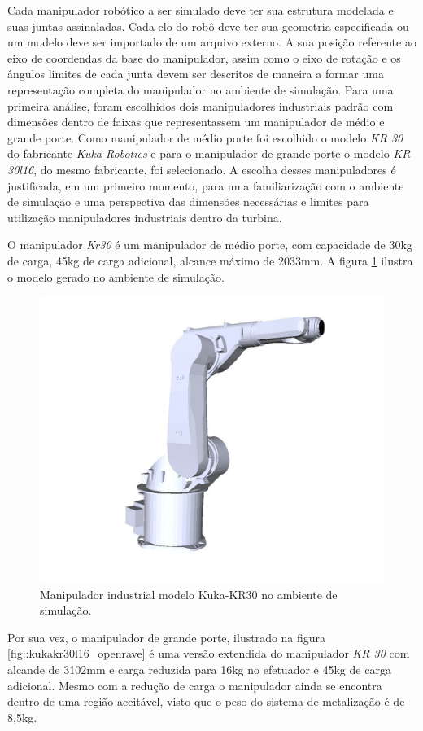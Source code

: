 Cada manipulador robótico a ser simulado deve ter sua estrutura modelada e suas
juntas assinaladas. Cada elo do robô deve ter sua geometria especificada ou um
modelo deve ser importado de um arquivo externo. A sua posição referente ao eixo
de coordendas da base do manipulador, assim como o eixo de rotação e os ângulos
limites de cada junta devem ser descritos de maneira a formar uma representação
completa do manipulador no ambiente de simulação. Para uma primeira análise,
foram escolhidos dois manipuladores industriais padrão com dimensões dentro de
faixas que representassem um manipulador de médio e grande porte. Como
manipulador de médio porte foi escolhido o modelo \textit{KR 30} do fabricante
\textit{Kuka Robotics} e para o manipulador de grande porte o modelo
\textit{KR 30l16}, do mesmo fabricante, foi selecionado.
A escolha desses manipuladores é justificada, em um primeiro momento, para uma
familiarização com o ambiente de simulação e uma perspectiva das dimensões
necessárias e limites para utilização manipuladores industriais dentro da
turbina.

O manipulador \textit{Kr30} é um manipulador de médio porte, com capacidade de
30kg de carga, 45kg de carga adicional, alcance máximo de 2033mm. A figura
\ref{fig::kukakr30_openrave} ilustra o modelo gerado no ambiente de simulação. 

\begin{figure}[h!]
\centering
	\includegraphics[width=0.8\columnwidth]{figs/openrave/kukakr30_openrave}
	\caption{Manipulador industrial modelo Kuka-KR30 no ambiente de simulação.}
	\label{fig::kukakr30_openrave}
\end{figure}

Por sua vez, o manipulador de grande porte, ilustrado na figura
\ref{fig::kukakr30l16_openrave} é uma versão extendida do manipulador \textit{KR
30} com alcande de 3102mm e carga reduzida para 16kg no efetuador e 45kg de 
carga adicional. Mesmo com a redução de carga o manipulador ainda se
encontra dentro de uma região aceitável, visto que o peso do sistema de
metalização é de 8,5kg.

